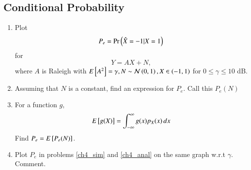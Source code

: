 \documentclass[journal,12pt,twocolumn]{IEEEtran}
\renewcommand\thesection{\arabic{section}}
\begin{document}
\begin{enumerate}[label=\thesection.\arabic*,ref=\thesection.\theenumi]
\section{Conditional Probability}
\begin{enumerate}[label=\thesection.\arabic*
,ref=\thesection.\theenumi]
\item
\label{ch4_sim}
Plot
\begin{equation}
P_e = \Pr\left(\hat{X} = -1|X=1\right)
\end{equation}
%
for
\begin{equation}
Y = AX+N,
\end{equation}
where $A$ is Raleigh with $E{}\left[A^2\right] = \gamma, N \sim \mathcal{N}\left(0,1\right), X \in \left(-1,1\right)$ for $0 \le \gamma \le 10$ dB.
%
\item
Assuming that $N$ is a constant, find an expression for $P_e$.  Call this $P_e(N)$
%
\item
%
\label{ch4_anal}
For a function $g$,
\begin{equation}
E{}\left[g(X)\right] = \int_{-\infty}^{\infty}g(x)p_{X}(x)\, dx
\end{equation}
%
Find $P_e = E{}\left[P_e(N)\right]$.
%
\item
Plot $P_e$ in problems \ref{ch4_sim} and \ref{ch4_anal} on the same graph w.r.t $\gamma$.  Comment.
		\end{enumerate}

\end{enumerate}
\end{document}
